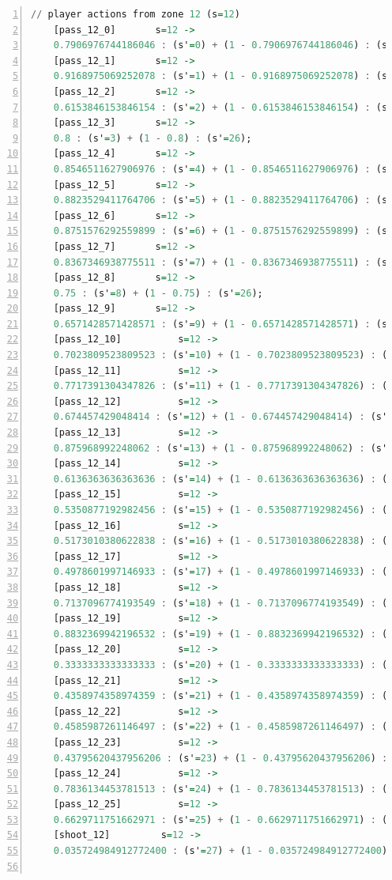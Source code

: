 \documentclass{l4proj}
\begin{document}
\begin{appendices}
\begin{lstlisting}[language=Haskell, numbers=left, caption=MDP used for strategy generation. This is the model specification as-is after the refinements at the end of chapter 3.]
	// player actions from zone 12 (s=12)
	[pass_12_0]	      s=12 ->
	0.7906976744186046 : (s'=0) + (1 - 0.7906976744186046) : (s'=26);
	[pass_12_1]	      s=12 ->
	0.9168975069252078 : (s'=1) + (1 - 0.9168975069252078) : (s'=26);
	[pass_12_2]	      s=12 ->
	0.6153846153846154 : (s'=2) + (1 - 0.6153846153846154) : (s'=26);
	[pass_12_3]	      s=12 ->
	0.8 : (s'=3) + (1 - 0.8) : (s'=26);
	[pass_12_4]	      s=12 ->
	0.8546511627906976 : (s'=4) + (1 - 0.8546511627906976) : (s'=26);
	[pass_12_5]	      s=12 ->
	0.8823529411764706 : (s'=5) + (1 - 0.8823529411764706) : (s'=26);
	[pass_12_6]	      s=12 ->
	0.8751576292559899 : (s'=6) + (1 - 0.8751576292559899) : (s'=26);
	[pass_12_7]	      s=12 ->
	0.8367346938775511 : (s'=7) + (1 - 0.8367346938775511) : (s'=26);
	[pass_12_8]	      s=12 ->
	0.75 : (s'=8) + (1 - 0.75) : (s'=26);
	[pass_12_9]	      s=12 ->
	0.6571428571428571 : (s'=9) + (1 - 0.6571428571428571) : (s'=26);
	[pass_12_10]	      s=12 ->
	0.7023809523809523 : (s'=10) + (1 - 0.7023809523809523) : (s'=26);
	[pass_12_11]	      s=12 ->
	0.7717391304347826 : (s'=11) + (1 - 0.7717391304347826) : (s'=26);
	[pass_12_12]	      s=12 ->
	0.674457429048414 : (s'=12) + (1 - 0.674457429048414) : (s'=26);
	[pass_12_13]	      s=12 ->
	0.875968992248062 : (s'=13) + (1 - 0.875968992248062) : (s'=26);
	[pass_12_14]	      s=12 ->
	0.6136363636363636 : (s'=14) + (1 - 0.6136363636363636) : (s'=26);
	[pass_12_15]	      s=12 ->
	0.5350877192982456 : (s'=15) + (1 - 0.5350877192982456) : (s'=26);
	[pass_12_16]	      s=12 ->
	0.5173010380622838 : (s'=16) + (1 - 0.5173010380622838) : (s'=26);
	[pass_12_17]	      s=12 ->
	0.4978601997146933 : (s'=17) + (1 - 0.4978601997146933) : (s'=26);
	[pass_12_18]	      s=12 ->
	0.7137096774193549 : (s'=18) + (1 - 0.7137096774193549) : (s'=26);
	[pass_12_19]	      s=12 ->
	0.8832369942196532 : (s'=19) + (1 - 0.8832369942196532) : (s'=26);
	[pass_12_20]	      s=12 ->
	0.3333333333333333 : (s'=20) + (1 - 0.3333333333333333) : (s'=26);
	[pass_12_21]	      s=12 ->
	0.4358974358974359 : (s'=21) + (1 - 0.4358974358974359) : (s'=26);
	[pass_12_22]	      s=12 ->
	0.4585987261146497 : (s'=22) + (1 - 0.4585987261146497) : (s'=26);
	[pass_12_23]	      s=12 ->
	0.43795620437956206 : (s'=23) + (1 - 0.43795620437956206) : (s'=26);
	[pass_12_24]	      s=12 ->
	0.7836134453781513 : (s'=24) + (1 - 0.7836134453781513) : (s'=26);
	[pass_12_25]	      s=12 ->
	0.6629711751662971 : (s'=25) + (1 - 0.6629711751662971) : (s'=26);
	[shoot_12]	       s=12 ->
	0.035724984912772400 : (s'=27) + (1 - 0.035724984912772400) : (s'=26);


\end{lstlisting}
\end{appendices}
\end{document}
